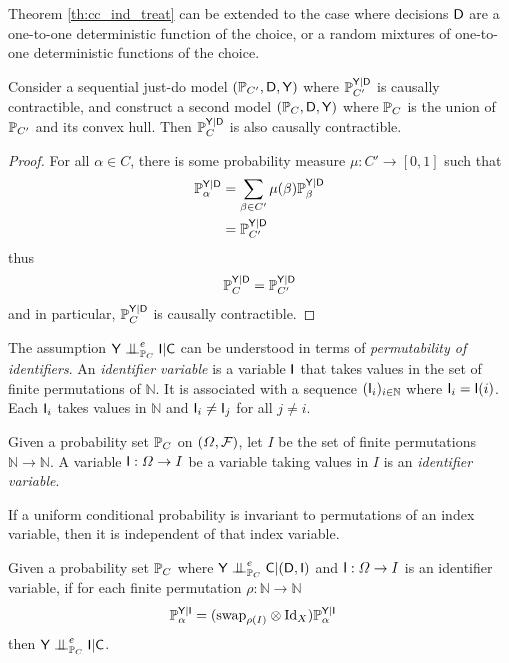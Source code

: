 Theorem \ref{th:cc_ind_treat} can be extended to the case where decisions $\mathsf{D}$ are a one-to-one deterministic function of the choice, or a random mixtures of one-to-one deterministic functions of the choice.

\begin{theorem}\label{cor:extend_to_randomised}
Consider a sequential just-do model $(\mathbb{P}_{C'},\mathsf{D},\mathsf{Y})$ where $\mathbb{P}_{C'}^{\mathsf{Y}|\mathsf{D}}$ is causally contractible, and construct a second model $(\mathbb{P}_{C},\mathsf{D},\mathsf{Y})$ where $\mathbb{P}_C$ is the union of $\mathbb{P}_{C'}$ and its convex hull. Then $\mathbb{P}_{C}^{\mathsf{Y}|\mathsf{D}}$ is also causally contractible.
\end{theorem}

\begin{proof}
For all $\alpha\in C$, there is some probability measure $\mu:C'\to [0,1]$ such that
\begin{align}
    \mathbb{P}_\alpha^{\mathsf{Y}|\mathsf{D}} &= \sum_{\beta\in C'} \mu(\beta) \mathbb{P}_\beta^{\mathsf{Y}|\mathsf{D}}\\
    &= \mathbb{P}_{C'}^{\mathsf{Y}|\mathsf{D}}
\end{align}
thus
\begin{align}
    \mathbb{P}_C^{\mathsf{Y}|\mathsf{D}} = \mathbb{P}_{C'}^{\mathsf{Y}|\mathsf{D}}
\end{align}
and in particular, $\mathbb{P}_C^{\mathsf{Y}|\mathsf{D}}$ is causally contractible.
\end{proof}

The assumption $\RV{Y}\CI^e_{\prob{P}_C} \RV{I} | \RV{C}$ can be understood in terms of \emph{permutability of identifiers}. An \emph{identifier variable} is a variable $\mathsf{I}$ that takes values in the set of finite permutations of $\mathbb{N}$. It is associated with a sequence $(\mathsf{I}_i)_{i\in \mathbb{N}}$ where $\mathsf{I}_i=\mathsf{I}(i)$. Each $\mathsf{I}_i$ takes values in $\mathbb{N}$ and $\mathsf{I}_i\neq \mathsf{I}_j$ for all $j\neq i$.

\begin{definition}
Given a probability set $\mathbb{P}_C$ on $(\Omega,\mathcal{F})$, let $I$ be the set of finite permutations $\mathbb{N}\to \mathbb{N}$. A variable $\mathsf{I}:\Omega\to I$ be a variable taking values in $I$ is an \emph{identifier variable}.
\end{definition}

If a uniform conditional probability is invariant to permutations of an index variable, then it is independent of that index variable.

\begin{lemma}\label{lem:ind}
Given a probability set $\mathbb{P}_C$ where $\RV{Y}\CI_{\prob{P}_C}^e \RV{C}|(\RV{D},\RV{I})$ and $\mathsf{I}:\Omega\to I$ is an identifier variable, if for each finite permutation $\rho:\mathbb{N}\to \mathbb{N}$
\begin{align}
    \mathbb{P}_\alpha^{\mathsf{Y}|\mathsf{I}} &= (\text{swap}_{\rho(I)}\otimes \text{Id}_X )\mathbb{P}_\alpha^{\mathsf{Y}|\mathsf{I}}
\end{align}
then $\RV{Y}\CI_{\prob{P}_C}^e \RV{I}|\RV{C}$.
\end{lemma}

